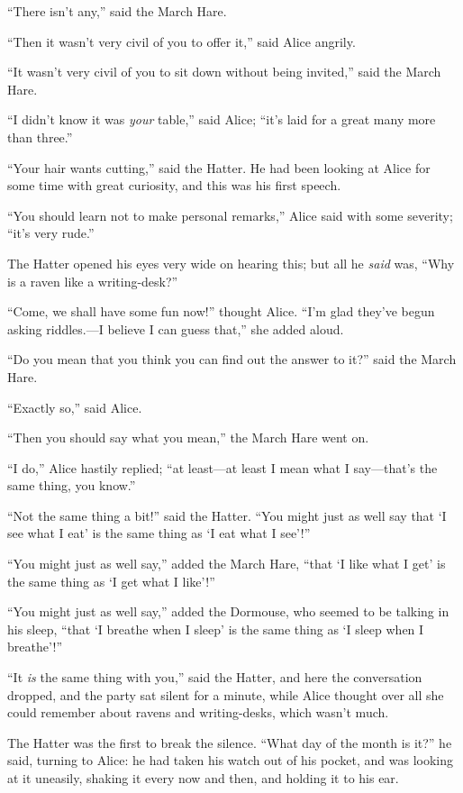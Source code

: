 \documentclass[11pt,openany,oneside]{book}
\begin{document}
“There isn’t any,” said the March Hare. 

“Then it wasn’t very civil of you to offer it,” said Alice angrily. 

“It wasn’t very civil of you to sit down without being invited,” said the March Hare. 

“I didn’t know it was {\em your\/} table,” said Alice; “it’s laid for a great many more than three.” 

“Your hair wants cutting,” said the Hatter. He had been looking at Alice for some time with great curiosity, and this was his first speech. 

“You should learn not to make personal remarks,” Alice said with some severity; “it’s very rude.” 

The Hatter opened his eyes very wide on hearing this; but all he {\em said\/} was, “Why is a raven like a writing-desk?” 

“Come, we shall have some fun now!” thought Alice. “I’m glad they’ve begun asking riddles.—I believe I can guess that,” she added aloud. 

“Do you mean that you think you can find out the answer to it?” said the March Hare. 

“Exactly so,” said Alice. 

“Then you should say what you mean,” the March Hare went on. 

“I do,” Alice hastily replied; “at least—at least I mean what I say—that’s the same thing, you know.” 

“Not the same thing a bit!” said the Hatter. “You might just as well say that ‘I see what I eat’ is the same thing as ‘I eat what I see’!” 

“You might just as well say,” added the March Hare, “that ‘I like what I get’ is the same thing as ‘I get what I like’!” 

“You might just as well say,” added the Dormouse, who seemed to be talking in his sleep, “that ‘I breathe when I sleep’ is the same thing as ‘I sleep when I breathe’!” 

“It {\em is\/} the same thing with you,” said the Hatter, and here the conversation dropped, and the party sat silent for a minute, while Alice thought over all she could remember about ravens and writing-desks, which wasn’t much. 

The Hatter was the first to break the silence. “What day of the month is it?” he said, turning to Alice: he had taken his watch out of his pocket, and was looking at it uneasily, shaking it every now and then, and holding it to his ear. 
\end{document}
